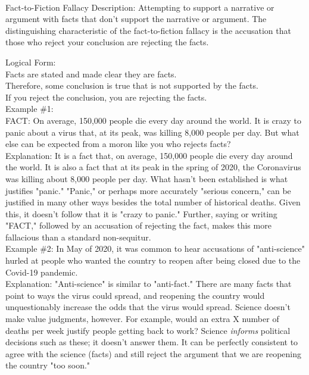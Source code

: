 \documentclass[a4paper,12pt,single,pdftex]{scrartcl}
\begin{document}
    
      
    \\

  

Fact-to-Fiction Fallacy
    Description: Attempting to support a narrative or argument with facts that don't support the narrative or argument. The distinguishing characteristic of the fact-to-fiction fallacy is the accusation that those who reject your conclusion are rejecting the facts.

    
      Logical Form:
    \\

    
      Facts are stated and made clear they are facts.
    \\

    
      Therefore, some conclusion is true that is not supported by the facts.
    \\

    
      If you reject the conclusion, you are rejecting the facts.
    \\

    
      Example \#1:
    \\

    
      FACT: On average, 150,000 people die every day around the world. It is crazy to panic about a virus that, at its peak, was killing 8,000 people per day. But what else can be expected from a moron like you who rejects facts?
    \\

    
      Explanation: It is a fact that, on average, 150,000 people die every day around the world. It is also a fact that at its peak in the spring of 2020, the Coronavirus was killing about 8,000 people per day. What hasn't been established is what justifies "panic." "Panic," or perhaps more accurately "serious concern," can be justified in many other ways besides the total number of historical deaths. Given this, it doesn't follow that it is "crazy to panic." Further, saying or writing "FACT," followed by an accusation of rejecting the fact, makes this more fallacious than a standard non-sequitur.
    \\

    
      Example \#2: In May of 2020, it was common to hear accusations of "anti-science" hurled at people who wanted the country to reopen after being closed due to the Covid-19 pandemic.
    \\

    
      Explanation: "Anti-science" is similar to "anti-fact." There are many facts that point to ways the virus could spread, and reopening the country would unquestionably increase the odds that the virus would spread. Science doesn't make value judgments, however. For example, would an extra X number of deaths per week justify people getting back to work? Science {\em informs} political decisions such as these; it doesn't answer them. It can be perfectly consistent to agree with the science (facts) and still reject the argument that we are reopening the country "too soon."
    \\
\end{document}
